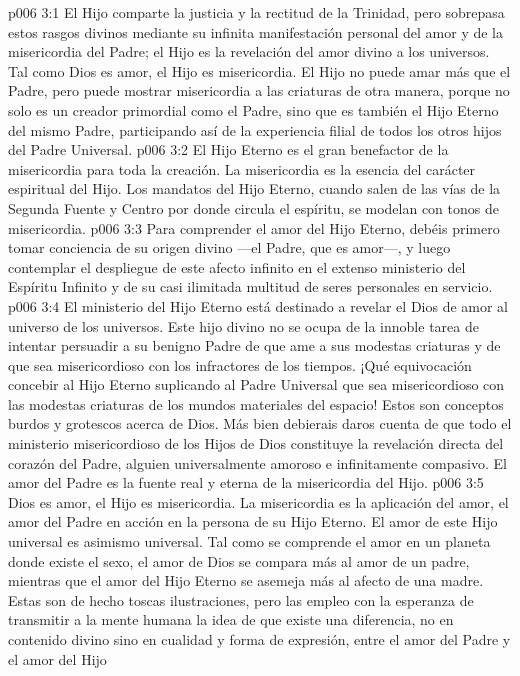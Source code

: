 \vs p006 3:1 El Hijo comparte la justicia y la rectitud de la Trinidad, pero sobrepasa estos rasgos divinos mediante su infinita manifestación personal del amor y de la misericordia del Padre; el Hijo es la revelación del amor divino a los universos. Tal como Dios es amor, el Hijo es misericordia. El Hijo no puede amar más que el Padre, pero puede mostrar misericordia a las criaturas de otra manera, porque no solo es un creador primordial como el Padre, sino que es también el Hijo Eterno del mismo Padre, participando así de la experiencia filial de todos los otros hijos del Padre Universal.
\vs p006 3:2 El Hijo Eterno es el gran benefactor de la misericordia para toda la creación. La misericordia es la esencia del carácter espiritual del Hijo. Los mandatos del Hijo Eterno, cuando salen de las vías de la Segunda Fuente y Centro por donde circula el espíritu, se modelan con tonos de misericordia.
\vs p006 3:3 Para comprender el amor del Hijo Eterno, debéis primero tomar conciencia de su origen divino ---el Padre, que es amor---, y luego contemplar el despliegue de este afecto infinito en el extenso ministerio del Espíritu Infinito y de su casi ilimitada multitud de seres personales en servicio.
\vs p006 3:4 El ministerio del Hijo Eterno está destinado a revelar el Dios de amor al universo de los universos. Este hijo divino no se ocupa de la innoble tarea de intentar persuadir a su benigno Padre de que ame a sus modestas criaturas y de que sea misericordioso con los infractores de los tiempos. ¡Qué equivocación concebir al Hijo Eterno suplicando al Padre Universal que sea misericordioso con las modestas criaturas de los mundos materiales del espacio! Estos son conceptos burdos y grotescos acerca de Dios. Más bien debierais daros cuenta de que todo el ministerio misericordioso de los Hijos de Dios constituye la revelación directa del corazón del Padre, alguien universalmente amoroso e infinitamente compasivo. El amor del Padre es la fuente real y eterna de la misericordia del Hijo.
\vs p006 3:5 Dios es amor, el Hijo es misericordia. La misericordia es la aplicación del amor, el amor del Padre en acción en la persona de su Hijo Eterno. El amor de este Hijo universal es asimismo universal. Tal como se comprende el amor en un planeta donde existe el sexo, el amor de Dios se compara más al amor de un padre, mientras que el amor del Hijo Eterno se asemeja más al afecto de una madre. Estas son de hecho toscas ilustraciones, pero las empleo con la esperanza de transmitir a la mente humana la idea de que existe una diferencia, no en contenido divino sino en cualidad y forma de expresión, entre el amor del Padre y el amor del Hijo
